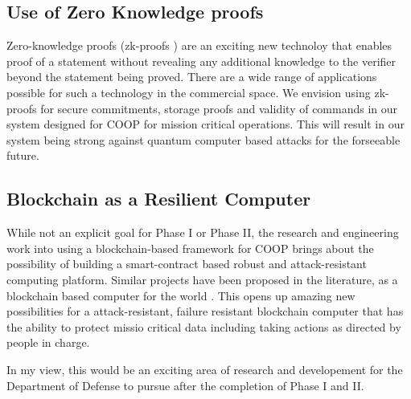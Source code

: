 \subsection{Use of Zero Knowledge proofs}

Zero-knowledge proofs (zk-proofs \cite{bunz2018}) are an exciting new technoloy that enables proof of a statement without revealing any additional
knowledge to the verifier beyond the statement being proved. There are a wide range of applications possible for such
a technology in the commercial space. We envision using zk-proofs for secure commitments, storage proofs and validity of
commands in our system designed for COOP for mission critical operations. This will result in our system being strong
against quantum computer based attacks for the forseeable future.

\subsection{Blockchain as a Resilient Computer}

While not an explicit goal for Phase I or Phase II, the research and engineering work into using a blockchain-based
framework for COOP brings about the possibility of building a smart-contract based robust and attack-resistant computing
platform. Similar projects have been proposed in the literature, as a blockchain based computer for the world
\cite{reyes2018, yahya2019, hanke2018}. This opens up amazing new possibilities for a attack-resistant, failure
resistant blockchain computer that has the ability to protect missio critical data including taking actions as directed
by people in charge.

In my view, this would be an exciting area of research and developement for the Department of Defense to pursue after the completion
of Phase I and II.

